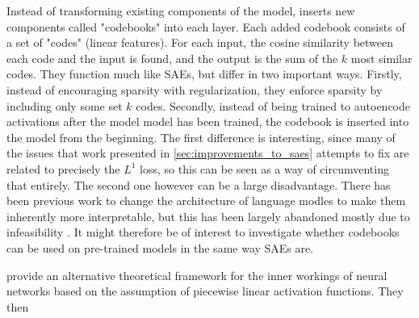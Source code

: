Instead of transforming existing components of the model, \textcite{tamkin_codebook_2023} inserts new components called "codebooks" into each layer.
Each added codebook consists of a set of "codes" (linear features).
For each input, the cosine similarity between each code and the input is found, and the output is the sum of the $k$ most similar codes. 
They function much like SAEs, but differ in two important ways.
Firstly, instead of encouraging sparsity with regularization, they enforce sparsity by including only some set $k$ codes.
Secondly, instead of being trained to autoencode activations after the model model has been trained, the codebook is inserted into the model from the beginning.
The first difference is interesting, since many of the issues that work presented in \ref{sec:improvements_to_saes} attempts to fix are related to precisely the $L^1$ loss, so this can be seen as a way of circumventing that entirely.
The second one however can be a large disadvantage.
There has been previous work \parencite{elhage_softmax_2022} to change the architecture of language modles to make them inherently more interpretable, but this has been largely abandoned mostly due to infeasibility \parencite{bricken_towards_2023}.
It might therefore be of interest to investigate whether codebooks can be used on pre-trained models in the same way SAEs are.


\textcite{black_interpreting_2022} provide an alternative theoretical framework for the inner workings of neural networks based on the assumption of piecewise linear activation functions.
They then 
